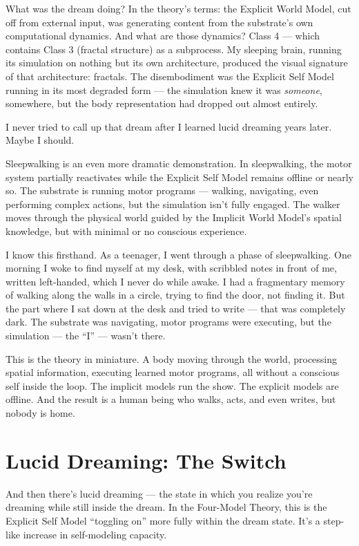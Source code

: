 \documentclass[11pt, twoside, openright]{book}
\begin{document}
What was the dream doing? In the theory's terms: the Explicit World Model, cut off from external input, was generating content from the substrate's own computational dynamics. And what are those dynamics? Class 4 --- which contains Class 3 (fractal structure) as a subprocess. My sleeping brain, running its simulation on nothing but its own architecture, produced the visual signature of that architecture: fractals. The disembodiment was the Explicit Self Model running in its most degraded form --- the simulation knew it was \textit{someone}, somewhere, but the body representation had dropped out almost entirely.

I never tried to call up that dream after I learned lucid dreaming years later. Maybe I should.

Sleepwalking is an even more dramatic demonstration. In sleepwalking, the motor system partially reactivates while the Explicit Self Model remains offline or nearly so. The substrate is running motor programs --- walking, navigating, even performing complex actions, but the simulation isn't fully engaged. The walker moves through the physical world guided by the Implicit World Model's spatial knowledge, but with minimal or no conscious experience.

I know this firsthand. As a teenager, I went through a phase of sleepwalking. One morning I woke to find myself at my desk, with scribbled notes in front of me, written left-handed, which I never do while awake. I had a fragmentary memory of walking along the walls in a circle, trying to find the door, not finding it. But the part where I sat down at the desk and tried to write --- that was completely dark. The substrate was navigating, motor programs were executing, but the simulation --- the ``I'' --- wasn't there.

This is the theory in miniature. A body moving through the world, processing spatial information, executing learned motor programs, all without a conscious self inside the loop. The implicit models run the show. The explicit models are offline. And the result is a human being who walks, acts, and even writes, but nobody is home.

\section*{Lucid Dreaming: The Switch}

And then there's lucid dreaming --- the state in which you realize you're dreaming while still inside the dream. In the Four-Model Theory, this is the Explicit Self Model ``toggling on'' more fully within the dream state. It's a step-like increase in self-modeling capacity.
\end{document}
